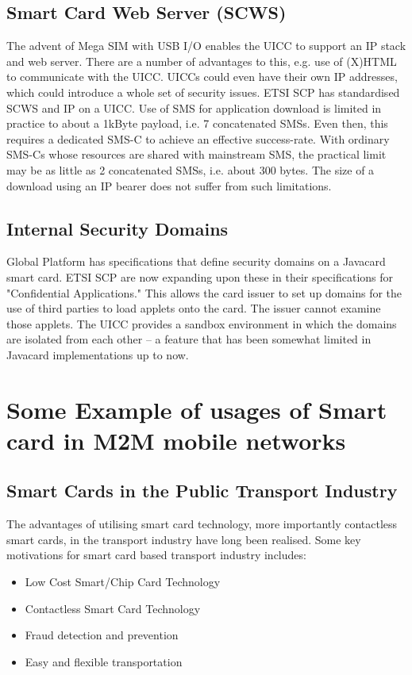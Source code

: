 \documentclass[12pt]{article}
\begin{document}
\subsection{Smart Card Web Server (SCWS)}
The advent of Mega SIM with USB I/O enables the UICC to support an IP stack and web server. There are a number of advantages to this, e.g. use of (X)HTML to communicate with the UICC. UICCs could even have their own IP addresses, which could introduce a whole set of security issues. ETSI SCP has standardised SCWS and IP on a UICC. Use of SMS for application download is limited in practice to about a 1kByte payload, i.e. 7 concatenated SMSs. Even then, this requires a dedicated SMS-C to achieve an effective success-rate. With ordinary SMS-Cs whose resources are shared with mainstream SMS, the practical limit may be as little as 2 concatenated SMSs, i.e. about 300 bytes. The size of a download using an IP bearer does not suffer from such limitations.

\subsection{Internal Security Domains}
Global Platform has specifications that define security domains on a Javacard smart card. ETSI SCP are now expanding upon these in their specifications for "Confidential Applications." This allows the card issuer to set up domains for the use of third parties to load applets onto the card. The issuer cannot examine those applets. The UICC provides a sandbox environment in which the domains are isolated from each other – a feature that has been somewhat limited in Javacard implementations up to now.

\section{Some Example of usages of Smart card in M2M mobile networks}
\subsection{Smart Cards in the Public Transport Industry}
The advantages of utilising smart card technology,
more importantly contactless smart cards, in the
transport industry have long been realised.\cite{ref4} Some key motivations for smart card based transport industry includes:
\begin{itemize}
\item Low Cost Smart/Chip Card Technology
\item Contactless Smart Card Technology
\item Fraud detection and prevention
\item Easy and flexible transportation
\end{itemize}
\end{document}
